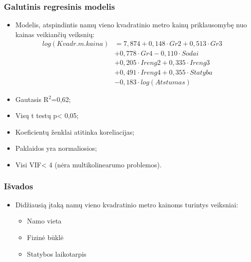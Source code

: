 \documentclass[utf8,hyperref={unicode}]{beamer}
\theoremstyle{change}\newtheorem{teorema}{Teiginys}
\theoremstyle{change}\newtheorem{salyga}{}
\begin{document}
\begin{frame}
   \frametitle{Galutinis regresinis modelis}
\begin{itemize}
           \item Modelis, atspindintis namų vieno kvadratinio metro kainų priklausomybę nuo kainas veikiančių veiksnių:
\begin{align*}
log(Kvadr.m. kaina)&=7,874+0,148\cdot Gr2+0,513\cdot  Gr3 \\&
+0,778\cdot Gr4-0,110\cdot Sodai\\&+0,205\cdot Ireng2+0,335\cdot Ireng3\\&+0,491\cdot Ireng4+0,355\cdot Statyba\\&-0,183\cdot log(Atstumas)
\end{align*}
           \item Gautasis R$^2$=0,62;
          \item Visų t testų p< 0,05;
          \item Koeficientų ženklai atitinka koreliacijas;
         \item Paklaidos yra normaliosios;
         \item Visi VIF< 4 (nėra multikolinearumo problemos).
    \end{itemize}
 \end{frame}

\begin{frame}
    \frametitle{Išvados}  
    \begin{itemize}
	\item Didžiausią įtaką namų vieno kvadratinio metro kainoms turintys veiksniai: 
                      \begin{itemize}
	            \item  Namo vieta
                        \item Fizinė būklė	
                       \item Statybos laikotarpis
                   \end{itemize}

\end{itemize}
\end{frame}
\end{document}

